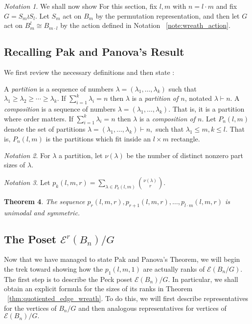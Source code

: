 \documentclass[10 pt]{amsart}
\theoremstyle{plain}
\newtheorem{thm}{Theorem}[section]
\theoremstyle{definition}
\theoremstyle{remark}
\newtheorem{note}[thm]{Notation}
\numberwithin{equation}{section}
\newcommand\ssec{\subsection}
\begin{document}
\begin{note}
We shall now show 
For this section, fix $l,m$ with $n = l \cdot m$ and fix $G = S_m \wr S_l.$ Let $S_m$ act on $B_m$ by the permutation representation, and then let $G$ act on $B_{m}^l\cong B_{m \cdot l}$ by the action defined in Notation ~\ref{note:wreath_action}.
\end{note}

\ssec{Recalling Pak and Panova's Result}
We first review the necessary definitions and then state \cite[Theorem 1.1]{pak}:

A {\it partition} is a sequence of numbers $\lambda = (\lambda_1,\ldots, \lambda_k)$ such that $\lambda_1 \geq \lambda_2 \geq \cdots \geq \lambda_k.$ If $\sum_{i=1}^k \lambda_i = n$ then $\lambda$ is a {\it partition of $n$}, notated $\lambda \vdash n.$ A {\it composition} is a sequence of numbers $\lambda = (\lambda_1,\ldots, \lambda_k).$ That is, it is a partition where order matters. If $\sum_{i=1}^k \lambda_i = n$ then $\lambda$ is a {\it composition of $n$}. Let $P_n(l,m)$ denote the set of partitions $\lambda = (\lambda_1,\ldots, \lambda_k) \vdash n,$ such that $\lambda_1 \leq m,k \leq l.$ That is, $P_n(l,m)$ is the partitions which fit inside an $l \times m$ rectangle.

\begin{note}
\cite[Section 1]{pak} For $\lambda$ a partition, let $\nu(\lambda)$ be the number of distinct nonzero part sizes of $\lambda.$
\end{note}

\begin{note}
\cite[Section 1]{pak}
Let $p_k(l,m,r) = \sum_{\lambda \in P_k(l,m)} \binom{\nu(\lambda)}{r}.$
\end{note}

\begin{thm}
\label{thm:pak_thm}
\cite[Theorem 1.1]{pak}
The sequence $p_r(l,m,r), p_{r+1}(l,m,r),\ldots, p_{l\cdot m}(l,m,r)$ is unimodal and symmetric.
\end{thm}

\ssec{The Poset $\mathcal E^r(B_n)/G$}
Now that we have managed to state Pak and Panova's Theorem, we will begin the trek toward showing how the $p_1(l,m,1)$ are actually ranks of $\mathcal E(B_n/G).$ The first step is to describe the Peck poset $\mathcal E(B_n)/G.$ In particular, we shall obtain an explicit formula for the sizes of its ranks in Theorem ~\ref{thm:quotiented_edge_wreath}. To do this, we will first describe representatives for the vertices of $B_n/G$ and then analogous representatives for vertices of $\mathcal E(B_n)/G.$
\end{document}
